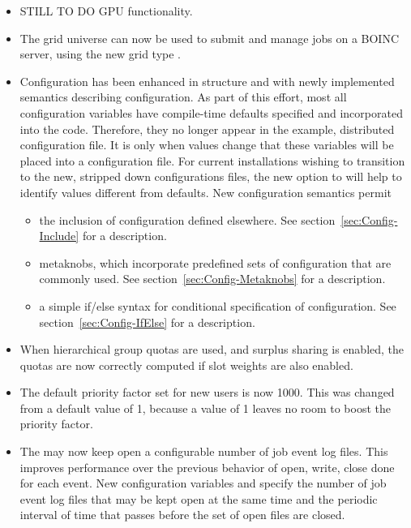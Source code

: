 \begin{itemize}

\item STILL TO DO GPU functionality.

\item The grid universe can now be used to submit and manage jobs on
a BOINC server, using the new grid type .

\item Configuration has been enhanced in structure and with
newly implemented semantics describing configuration.
As part of this effort, most all configuration variables have
compile-time defaults specified and incorporated into the code.
Therefore, they no longer appear in the example, distributed
configuration file.
It is only when values change that these variables will be placed
into a configuration file.
For current installations wishing to transition to the new, stripped down
configurations files, 
the new  option to  will
help to identify values different from defaults.
New configuration semantics permit
\begin{itemize}
  \item the inclusion of configuration defined elsewhere.
  See section~\ref{sec:Config-Include} for a description.
  \item metaknobs, which incorporate predefined sets of configuration
  that are commonly used.
  See section~\ref{sec:Config-Metaknobs} for a description.
  \item a simple if/else syntax for conditional specification of 
  configuration. 
  See section~\ref{sec:Config-IfElse} for a description.
\end{itemize}

\item When hierarchical group quotas are used, and surplus
sharing is enabled, the quotas are now correctly computed
if slot weights are also enabled.

\item The default priority factor set for new users is now 1000.
This was changed from a default value of 1, because a value of 1 
leaves no room to boost the priority factor.

\item The  may now keep open a configurable number
of job event log files.
This improves performance over the previous behavior of
open, write, close done for each event.
New configuration variables  and 
 specify the number
of job event log files that may be kept open at the same time
and the periodic interval of time that passes
before the set of open files are closed.


\end{itemize}
